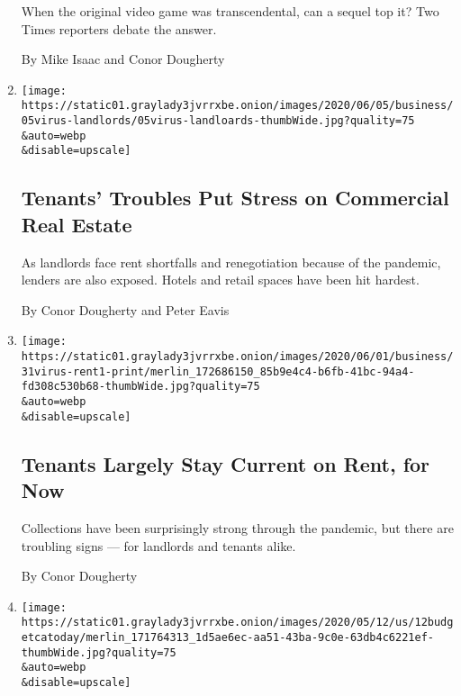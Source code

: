 \begin{enumerate}
  When the original video game was transcendental, can a sequel top it?
  Two Times reporters debate the answer.

  By Mike Isaac and Conor Dougherty
\item
  \href{/2020/06/05/business/economy/coronavirus-commercial-real-estate.html}{}

  \texttt{[image: https://static01.graylady3jvrrxbe.onion/images/2020/06/05/business/05virus-landlords/05virus-landloards-thumbWide.jpg?quality=75\\\&auto=webp\\\&disable=upscale]}

  \hypertarget{tenants-troubles-put-stress-on-commercial-real-estate}{%
  \subsection{Tenants' Troubles Put Stress on Commercial Real
  Estate}\label{tenants-troubles-put-stress-on-commercial-real-estate}}

  As landlords face rent shortfalls and renegotiation because of the
  pandemic, lenders are also exposed. Hotels and retail spaces have been
  hit hardest.

  By Conor Dougherty and Peter Eavis
\item
  \href{/2020/05/31/business/economy/coronavirus-rent-landlords-tenants.html}{}

  \texttt{[image: https://static01.graylady3jvrrxbe.onion/images/2020/06/01/business/31virus-rent1-print/merlin\_172686150\_85b9e4c4-b6fb-41bc-94a4-fd308c530b68-thumbWide.jpg?quality=75\\\&auto=webp\\\&disable=upscale]}

  \hypertarget{tenants-largely-stay-current-on-rent-for-now}{%
  \subsection{Tenants Largely Stay Current on Rent, for
  Now}\label{tenants-largely-stay-current-on-rent-for-now}}

  Collections have been surprisingly strong through the pandemic, but
  there are troubling signs --- for landlords and tenants alike.

  By Conor Dougherty
\item
  \href{/2020/05/12/us/coronavirus-newsom-budget-proposal.html}{}

  \texttt{[image: https://static01.graylady3jvrrxbe.onion/images/2020/05/12/us/12budgetcatoday/merlin\_171764313\_1d5ae6ec-aa51-43ba-9c0e-63db4c6221ef-thumbWide.jpg?quality=75\\\&auto=webp\\\&disable=upscale]}


\end{enumerate}
